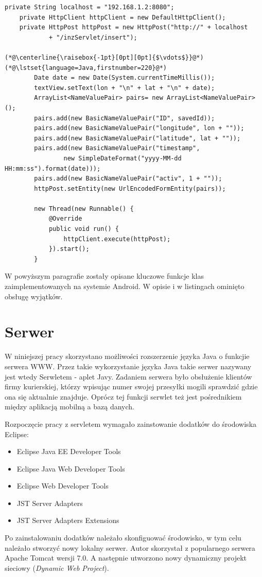 \documentclass[eng,printmode,oneside]{mgr}
\begin{document}
\begin{lstlisting}[caption=Przygotowanie wiadomości do wysłania na
serwer oraz wysłanie jej,label=polaczenieSerwer] 
	private String localhost = "192.168.1.2:8080";
	private HttpClient httpClient = new DefaultHttpClient();
	private HttpPost httpPost = new HttpPost("http://" + localhost
			+ "/inzServlet/insert");
			
(*@\centerline{\raisebox{-1pt}[0pt][0pt]{$\vdots$}}@*)
(*@\lstset{language=Java,firstnumber=220}@*)
		Date date = new Date(System.currentTimeMillis()); 
		textView.setText(lon + "\n" + lat + "\n" + date); 
		ArrayList<NameValuePair> pairs= new ArrayList<NameValuePair>(); 
		pairs.add(new BasicNameValuePair("ID", savedId));
		pairs.add(new BasicNameValuePair("longitude", lon + ""));
		pairs.add(new BasicNameValuePair("latitude", lat + ""));
		pairs.add(new BasicNameValuePair("timestamp",
				new SimpleDateFormat("yyyy-MM-dd HH:mm:ss").format(date)));
		pairs.add(new BasicNameValuePair("activ", 1 + ""));
		httpPost.setEntity(new UrlEncodedFormEntity(pairs));
		
		new Thread(new Runnable() {
			@Override
			public void run() {
				httpClient.execute(httpPost);
			}).start();
		}
\end{lstlisting}

W powyższym paragrafie zostały opisane kluczowe funkcje klas zaimplementowanych
na systemie Android. W opisie i w listingach ominięto obsługę wyjątków. 

\section{Serwer}

W niniejszej pracy skorzystano możliwości rozszerzenie języka Java o funkcjie
serwera WWW. Przez takie wykorzystanie języka Java takie serwer nazywany jest
wtedy Serwletem - aplet Javy. Zadaniem serwera było obsłużenie klientów firmy
kurierskiej, którzy wpisując numer swojej przesyłki mogili sprawdzić gdzie ona
się aktualnie znajduje. Oprócz tej funkcji serwlet też jest pośrednikiem
między aplikacją mobilną a bazą danych.

Rozpoczęcie pracy z servletem wymagało zainstowanie dodatków do środowiska
Eclipse:
\begin{itemize}
  \item Eclipse Java EE Developer Tools
  \item Eclipse Java Web Developer Tools
  \item Eclipse Web Developer Tools
  \item JST Server Adapters
  \item JST Server Adapters Extensions
\end{itemize}
Po zainstalowaniu dodatków należało skonfiguować środowisko, w tym celu należało
stworzyć nowy lokalny serwer. Autor skorzystał z popularnego serwera Apache
Tomcat wersji 7.0. A następnie utworzono nowy dynamiczny projekt sieciowy
(\textsl{Dynamic Web Project}). 
\end{document}
